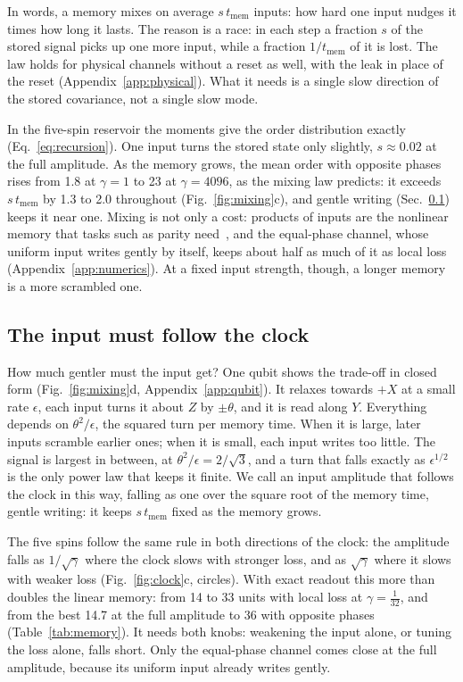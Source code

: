 In words, a memory mixes on average $s\,t_{\mathrm{mem}}$ inputs: how hard one input nudges it times how long it
lasts. The reason is a race: in each step a fraction $s$ of the stored signal picks up one more input, while a
fraction $1/t_{\mathrm{mem}}$ of it is lost. The law holds for physical channels without a reset as well, with the
leak in place of the reset (Appendix~\ref{app:physical}). What it needs is a single slow direction of the stored
covariance, not a single slow mode.

In the five-spin reservoir the moments give the order distribution exactly (Eq.~\eqref{eq:recursion}). One input
turns the stored state only slightly, $s\approx0.02$ at the full amplitude. As the memory grows, the mean order with
opposite phases rises from 1.8 at $\gamma=1$ to 23 at $\gamma=4096$, as the mixing law predicts: it exceeds
$s\,t_{\mathrm{mem}}$ by 1.3 to 2.0 throughout (Fig.~\ref{fig:mixing}c), and gentle writing (Sec.~\ref{sec:writing})
keeps it near one. Mixing is not only a cost:
products of inputs are the nonlinear memory that tasks such as parity need~\cite{Dambre2012,Inubushi2017}, and the
equal-phase channel, whose uniform input writes gently by itself, keeps about half as much of it as local loss
(Appendix~\ref{app:numerics}). At a fixed input strength, though, a longer memory is a more scrambled one.


\subsection{The input must follow the clock}
\label{sec:writing}
How much gentler must the input get? One qubit shows the trade-off in closed form (Fig.~\ref{fig:mixing}d,
Appendix~\ref{app:qubit}). It relaxes towards $+X$ at a small rate $\epsilon$, each input turns it about $Z$ by
$\pm\theta$, and it is read along $Y$. Everything depends on $\theta^2/\epsilon$, the squared turn per memory time.
When it is large, later inputs scramble earlier ones; when it is small, each input writes too little. The signal is
largest in between, at $\theta^2/\epsilon=2/\sqrt3$, and a turn that falls exactly as $\epsilon^{1/2}$ is the only
power law that keeps it finite. We call an input amplitude that follows the clock in this way, falling as one over the
square root of the memory time, gentle writing: it keeps $s\,t_{\mathrm{mem}}$ fixed as the memory grows.

The five spins follow the same rule in both directions of the clock: the amplitude falls as $1/\sqrt\gamma$ where the
clock slows with stronger loss, and as $\sqrt\gamma$ where it slows with weaker loss (Fig.~\ref{fig:clock}c,
circles). With exact readout this more than doubles the linear memory: from 14 to 33 units with local loss at
$\gamma=\frac1{32}$, and from the best 14.7 at the full amplitude to 36 with opposite phases (Table~\ref{tab:memory}). It needs both knobs: weakening the input alone, or tuning the
loss alone, falls short. Only the equal-phase channel comes close at the full amplitude, because its uniform input
already writes gently.

